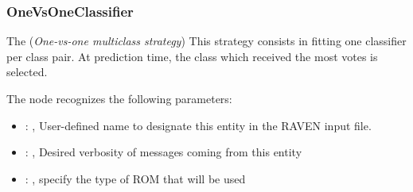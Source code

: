 \subsubsection{OneVsOneClassifier}
  The  (\textit{One-vs-one multiclass strategy})
  This strategy consists in fitting one classifier per class pair. At prediction time, the class
  which received the most votes is selected.

  The  node recognizes the following parameters:
    \begin{itemize}
      \item {}: , 
        User-defined name to designate this entity in the RAVEN input file.
      \item {}: , 
        Desired verbosity of messages coming from this entity
      \item {}: , 
        specify the type of ROM that will be used
  \end{itemize}

